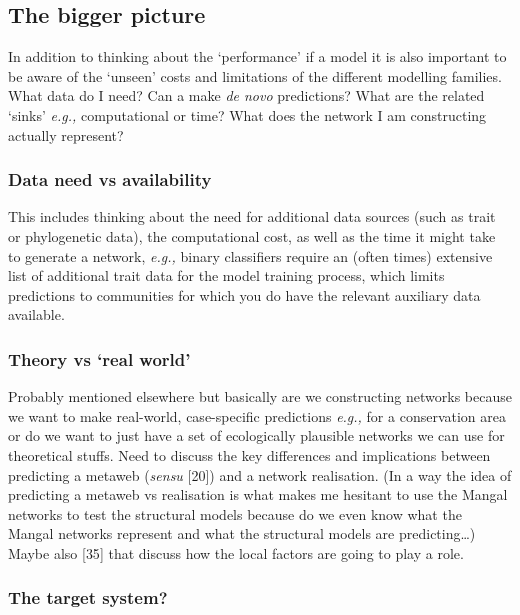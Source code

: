 \documentclass[
]{article}
\begin{document}
\subsection{The bigger picture}\label{the-bigger-picture}

In addition to thinking about the `performance' if a model it is also
important to be aware of the `unseen' costs and limitations of the
different modelling families. What data do I need? Can a make \emph{de
novo} predictions? What are the related `sinks' \emph{e.g.,}
computational or time? What does the network I am constructing actually
represent?

\subsubsection{Data need vs
availability}\label{data-need-vs-availability}

This includes thinking about the need for additional data sources (such
as trait or phylogenetic data), the computational cost, as well as the
time it might take to generate a network, \emph{e.g.,} binary
classifiers require an (often times) extensive list of additional trait
data for the model training process, which limits predictions to
communities for which you do have the relevant auxiliary data available.

\subsubsection{Theory vs `real world'}\label{theory-vs-real-world}

Probably mentioned elsewhere but basically are we constructing networks
because we want to make real-world, case-specific predictions
\emph{e.g.,} for a conservation area or do we want to just have a set of
ecologically plausible networks we can use for theoretical stuffs. Need
to discuss the key differences and implications between predicting a
metaweb (\emph{sensu} {[}20{]}) and a network realisation. (In a way the
idea of predicting a metaweb vs realisation is what makes me hesitant to
use the Mangal networks to test the structural models because do we even
know what the Mangal networks represent and what the structural models
are predicting\ldots) Maybe also {[}35{]} that discuss how the local
factors are going to play a role.

\subsubsection{The target system?}\label{the-target-system}
\end{document}
